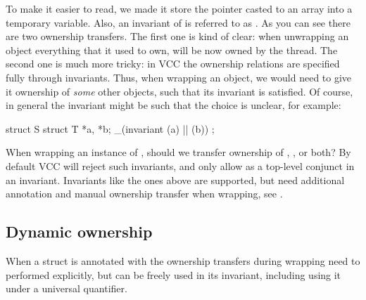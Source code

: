 \noindent
To make it easier to read, we made it store the  pointer
casted to an array into a temporary variable.
Also, an invariant of  is referred to as .
As you can see there are two ownership transfers.
The first one is kind of clear: when unwrapping an object everything that it used
to own, will be now owned by the thread.
The second one is much more tricky: 
in VCC the ownership relations are specified fully through invariants.
Thus, when wrapping an object, we would need to give it ownership
of \emph{some} other objects, such that its invariant is satisfied.
Of course, in general the invariant might be such that the choice
is unclear, for example:
\begin{VCC}
struct S {
  struct T *a, *b;
  _(invariant \mine(a) || \mine(b))
};
\end{VCC}
When wrapping an instance of , should we transfer ownership of , , or both?
By default VCC will reject such invariants, and only allow 
as a top-level conjunct in an invariant.
Invariants like the ones above are supported, but need additional annotation
and manual ownership transfer when wrapping, see .


\subsection{Dynamic ownership}
\label{sect:dynamic-ownership}

When a struct is annotated with  the ownership transfers
during wrapping need to performed explicitly, but  can
be freely used in its invariant, including using it under a universal
quantifier.


